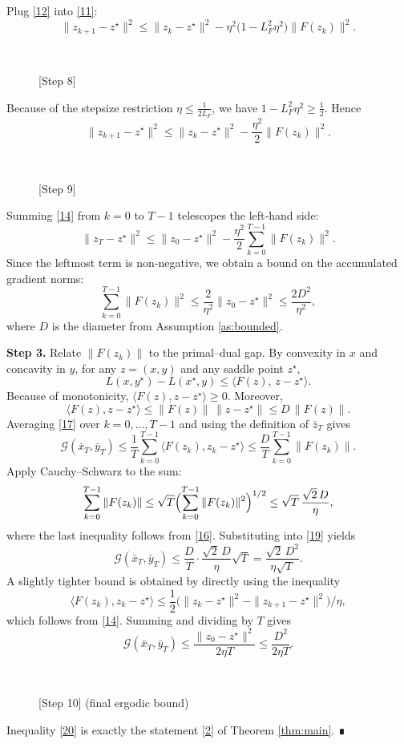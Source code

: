 \documentclass{article}
\newcommand{\gap}{\mathcal{G}}
\begin{document}
Plug \eqref{12} into \eqref{11}:
\[
\|z_{k+1}-z^{\star}\|^{2}
\le \|z_{k}-z^{\star}\|^{2}
   -\eta^{2}\bigl(1-L_{F}^{2}\eta^{2}\bigr)\|F(z_{k})\|^{2}.
\tag{13}
\]
\begin{description}
\item[\,] \hfill[Step 8]
\end{description}
Because of the stepsize restriction $\eta\le\frac{1}{2L_{F}}$, we have $1-L_{F}^{2}\eta^{2}\ge\frac12$. Hence
\[
\|z_{k+1}-z^{\star}\|^{2}
\le \|z_{k}-z^{\star}\|^{2}
   -\frac{\eta^{2}}{2}\|F(z_{k})\|^{2}.
\tag{14}
\]
\begin{description}
\item[\,] \hfill[Step 9]
\end{description}
Summing \eqref{14} from $k=0$ to $T-1$ telescopes the left‑hand side:
\[
\|z_{T}-z^{\star}\|^{2}
\le \|z_{0}-z^{\star}\|^{2}
   -\frac{\eta^{2}}{2}\sum_{k=0}^{T-1}\|F(z_{k})\|^{2}.
\tag{15}
\]
Since the leftmost term is non‑negative, we obtain a bound on the accumulated gradient norms:
\[
\sum_{k=0}^{T-1}\|F(z_{k})\|^{2}
\le \frac{2}{\eta^{2}}\|z_{0}-z^{\star}\|^{2}
\le \frac{2D^{2}}{\eta^{2}},
\tag{16}
\]
where $D$ is the diameter from Assumption \ref{as:bounded}.

\bigskip
\noindent\textbf{Step 3.}  Relate $\|F(z_{k})\|$ to the primal–dual gap.  By convexity in $x$ and concavity in $y$, for any $z=(x,y)$ and any saddle point $z^{\star}$,
\[
L(x,y^{\star})-L(x^{\star},y)
\le \langle F(z),\,z-z^{\star}\rangle .
\tag{17}
\]
Because of monotonicity, $\langle F(z),z-z^{\star}\rangle\ge0$. Moreover,
\[
\langle F(z),z-z^{\star}\rangle
\le \|F(z)\|\,\|z-z^{\star}\|
\le D\,\|F(z)\|.
\tag{18}
\]
Averaging \eqref{17} over $k=0,\dots,T-1$ and using the definition of $\bar z_{T}$ gives
\[
\gap(\bar x_{T},\bar y_{T})
\le \frac{1}{T}\sum_{k=0}^{T-1}\langle F(z_{k}),z_{k}-z^{\star}\rangle
\le \frac{D}{T}\sum_{k=0}^{T-1}\|F(z_{k})\|.
\tag{19}
\]
Apply Cauchy–Schwarz to the sum:
\[
\sum_{k=0}^{T-1}\|F(z_{k})\|
\le \sqrt{T}\Bigl(\sum_{k=0}^{T-1}\|F(z_{k})\|^{2}\Bigr)^{1/2}
\le \sqrt{T}\,\frac{\sqrt{2}\,D}{\eta},
\]
where the last inequality follows from \eqref{16}. Substituting into \eqref{19} yields
\[
\gap(\bar x_{T},\bar y_{T})
\le \frac{D}{T}\cdot\frac{\sqrt{2}\,D}{\eta}\sqrt{T}
= \frac{\sqrt{2}\,D^{2}}{\eta\sqrt{T}}.
\]
A slightly tighter bound is obtained by directly using the inequality
\[
\langle F(z_{k}),z_{k}-z^{\star}\rangle
\le \frac12\bigl(\|z_{k}-z^{\star}\|^{2}-\|z_{k+1}-z^{\star}\|^{2}\bigr)/\eta,
\]
which follows from \eqref{14}. Summing and dividing by $T$ gives
\[
\gap(\bar x_{T},\bar y_{T})
\le \frac{\|z_{0}-z^{\star}\|^{2}}{2\eta T}
\le\frac{D^{2}}{2\eta T}.
\tag{20}
\]
\begin{description}
\item[\,] \hfill[Step 10] (final ergodic bound)
\end{description}
Inequality \eqref{20} is exactly the statement \eqref{2} of Theorem \ref{thm:main}. ∎
\end{document}
